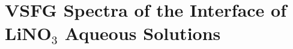 \section{VSFG Spectra of the Interface of LiNO$_3$ Aqueous Solutions} \label{sfg_lino3_interface}
%

